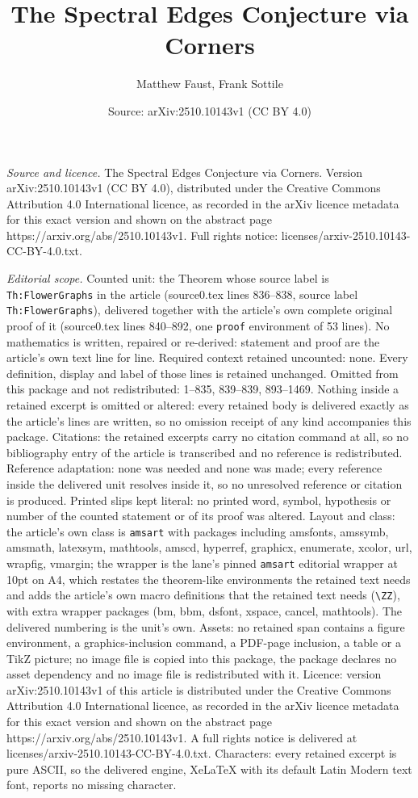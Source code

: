 \documentclass[10pt,a4paper]{amsart}
\title[The Spectral Edges Conjecture via Corners]{The Spectral Edges Conjecture via Corners}
\author{Matthew Faust, Frank Sottile}
\date{Source: arXiv:2510.10143v1 (CC BY 4.0)}
\begin{document}
\maketitle

\noindent\emph{Source and licence.} The Spectral Edges Conjecture via Corners. Version arXiv:2510.10143v1 (CC BY 4.0), distributed under the Creative Commons Attribution 4.0 International licence, as recorded in the arXiv licence metadata for this exact version and shown on the abstract page https://arxiv.org/abs/2510.10143v1. Full rights notice: licenses/arxiv-2510.10143-CC-BY-4.0.txt.\par\smallskip

\noindent\textit{Editorial scope.} Counted unit: the Theorem whose source label is \texttt{Th:FlowerGraphs} in the article (source0.tex lines 836--838, source label \texttt{Th:FlowerGraphs}), delivered together with the article's own complete original proof of it (source0.tex lines 840--892, one \texttt{proof} environment of 53 lines). No mathematics is written, repaired or re-derived: statement and proof are the article's own text line for line. Required context retained uncounted: none. Every definition, display and label of those lines is retained unchanged. Omitted from this package and not redistributed: 1--835, 839--839, 893--1469. Nothing inside a retained excerpt is omitted or altered: every retained body is delivered exactly as the article's lines are written, so no omission receipt of any kind accompanies this package. Citations: the retained excerpts carry no citation command at all, so no bibliography entry of the article is transcribed and no reference is redistributed. Reference adaptation: none was needed and none was made; every reference inside the delivered unit resolves inside it, so no unresolved reference or citation is produced. Printed slips kept literal: no printed word, symbol, hypothesis or number of the counted statement or of its proof was altered. Layout and class: the article's own class is \texttt{amsart} with packages including amsfonts, amssymb, amsmath, latexsym, mathtools, amscd, hyperref, graphicx, enumerate, xcolor, url, wrapfig, vmargin; the wrapper is the lane's pinned \texttt{amsart} editorial wrapper at 10pt on A4, which restates the theorem-like environments the retained text needs and adds the article's own macro definitions that the retained text needs (\texttt{\textbackslash ZZ}), with extra wrapper packages (bm, bbm, dsfont, xspace, cancel, mathtools). The delivered numbering is the unit's own. Assets: no retained span contains a figure environment, a graphics-inclusion command, a PDF-page inclusion, a table or a TikZ picture; no image file is copied into this package, the package declares no asset dependency and no image file is redistributed with it. Licence: version arXiv:2510.10143v1 of this article is distributed under the Creative Commons Attribution 4.0 International licence, as recorded in the arXiv licence metadata for this exact version and shown on the abstract page https://arxiv.org/abs/2510.10143v1. A full rights notice is delivered at licenses/arxiv-2510.10143-CC-BY-4.0.txt. Characters: every retained excerpt is pure ASCII, so the delivered engine, XeLaTeX with its default Latin Modern text font, reports no missing character.
\end{document}
